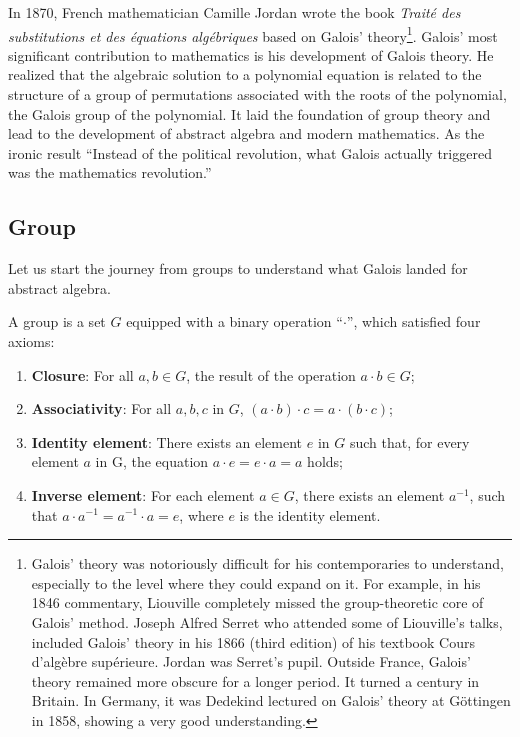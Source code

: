 \documentclass{article}
\begin{document}
In 1870, French mathematician Camille Jordan wrote the book {\em Traité des substitutions et des équations algébriques} based on Galois' theory\footnote{Galois' theory was notoriously difficult for his contemporaries to understand, especially to the level where they could expand on it. For example, in his 1846 commentary, Liouville completely missed the group-theoretic core of Galois' method. Joseph Alfred Serret who attended some of Liouville's talks, included Galois' theory in his 1866 (third edition) of his textbook Cours d'algèbre supérieure. Jordan was Serret's pupil. Outside France, Galois' theory remained more obscure for a longer period. It turned a century in Britain. In Germany, it was Dedekind lectured on Galois' theory at Göttingen in 1858, showing a very good understanding.}. Galois' most significant contribution to mathematics is his development of Galois theory. He realized that the algebraic solution to a polynomial equation is related to the structure of a group of permutations associated with the roots of the polynomial, the Galois group of the polynomial. It laid the foundation of group theory and lead to the development of abstract algebra and modern mathematics. As the ironic result ``Instead of the political revolution, what Galois actually triggered was the mathematics revolution\cite{StepanovRose15}.''

\subsection{Group}

Let us start the journey from groups to understand what Galois landed for abstract algebra.

\begin{definition} A group is a set $G$ equipped with a binary operation ``$\cdot$'', which satisfied four axioms:

\begin{enumerate}
\item \textbf{Closure}: For all $a, b \in G$, the result of the operation $a \cdot b \in G$;
\item \textbf{Associativity}: For all $a, b, c$ in $G$, $(a \cdot b) \cdot c = a \cdot (b \cdot c)$;
\item \textbf{Identity element}: There exists an element $e$ in $G$ such that, for every element $a$ in G, the equation $a \cdot e = e \cdot a = a$ holds;
\item \textbf{Inverse element}: For each element $a \in G$, there exists an element $a^{-1}$, such that $a \cdot a^{-1} = a^{-1} \cdot a = e$, where $e$ is the identity element.
\end{enumerate}
\end{definition}
\end{document}
